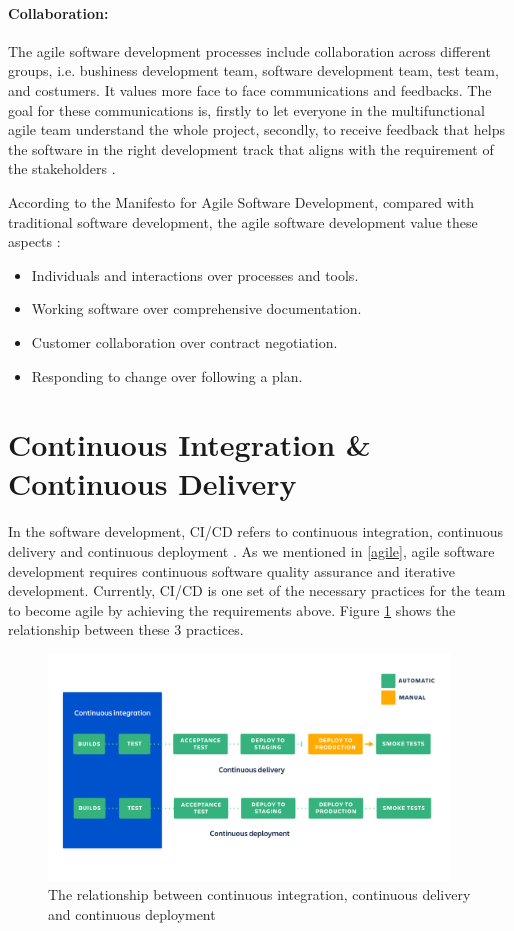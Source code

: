 \paragraph{Collaboration:}
The agile software development processes include collaboration across different groups, i.e. bushiness development team, software development team, test team, and costumers. It values more face to face communications \cite{beck2001principles} and feedbacks. The goal for these communications is, firstly to let everyone in the multifunctional agile team understand the whole project, secondly, to receive feedback that helps the software in the right development track that aligns with the requirement of the stakeholders \cite{beck2001manifesto}. 
\par
According to the Manifesto for Agile Software Development, compared with traditional software development, the agile software development value these aspects \cite{beck2001manifesto}: 
\begin{itemize}
\item Individuals and interactions over processes and tools.
\item Working software over comprehensive documentation.
\item Customer collaboration over contract negotiation.
\item Responding to change over following a plan.
\end{itemize}
\section{Continuous Integration \& Continuous Delivery}
In the software development, CI/CD refers to continuous integration, continuous delivery and continuous deployment \cite{pittet2018continuous}. As we mentioned in \ref{agile}, agile software development requires continuous software quality assurance and iterative development. Currently, CI/CD is one set of the necessary practices for the team to become agile by achieving the requirements above. Figure \ref{fig:cicd} shows the relationship between these 3 practices.
\begin{figure}[h]
    \centering
    \includegraphics[width=0.95\textwidth]{pics/cicd.png}
    \caption{The relationship between continuous integration, continuous delivery and continuous deployment \cite{pittet2018continuous}}
    \label{fig:cicd}
\end{figure}

